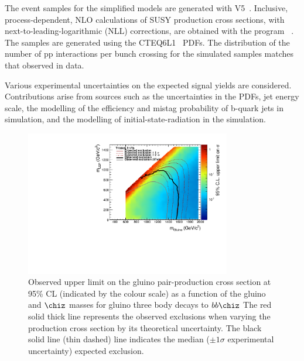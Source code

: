 The event samples for the simplified models are generated 
with \MADGRAPH V5~\cite{madgraph}.
Inclusive, process-dependent, NLO
calculations of SUSY production cross sections, with
next-to-leading-logarithmic (NLL) corrections, are obtained with the
program \PROSPINO~\cite{Beenakker:1996ch, PhysRevD.80.095004,PhysRevLett.102.111802, PhysRevD.80.095004, 1126-6708-2009-12-041,
  doi:10.1142/S0217751X11053560, susy-nlo-nll}. The samples are
generated using the CTEQ6L1~\cite{Pumplin:2002vw} PDFs. The
distribution of the number of pp interactions per bunch crossing for
the simulated samples matches that observed in data.

Various experimental uncertainties on the expected signal yields are
considered. Contributions arise from sources such as the uncertainties in the PDFs, jet energy
scale, the modelling of the efficiency and mistag probability of
b-quark jets in simulation, and the modelling of initial-state-radiation in the simulation.

\begin{figure}[tbhp]

  \begin{center}
    \includegraphics[width=0.8\textwidth]{xs_contour_withHisto.pdf}
    \caption{Observed upper limit on the gluino pair-production cross section at 95\% CL (indicated by the colour scale) as a function of the gluino
      and $\chiz$ masses for gluino three body decays to $bb\chiz$
      The red solid thick line represents the observed exclusions when
      varying the production cross section by its theoretical uncertainty. 
      The black solid line (thin dashed) line indicates the median (${\pm}1 \sigma$ 
      experimental uncertainty) expected exclusion.
      \label{fig:limits-sms} }
  \end{center}
\end{figure}


